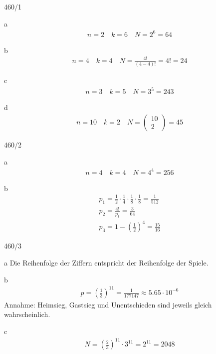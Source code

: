 \begin{exercise}{460/1}
  \item [a]
  \begin{gather*}
    n = 2 \quad k = 6 \quad N = 2^6 = 64
  \end{gather*}
  \item [b]
  \begin{gather*}
    n = 4 \quad k = 4 \quad N = \frac{4!}{(4 - 4)!} = 4! = 24
  \end{gather*}
  \item [c]
  \begin{gather*}
    n = 3 \quad k = 5 \quad N = 3^5 = 243
  \end{gather*}
  \item [d]
  \begin{gather*}
    n = 10 \quad k = 2 \quad N = \begin{pmatrix}10 \\ 2\end{pmatrix} = 45
  \end{gather*}
\end{exercise}
\begin{exercise}{460/2}
  \item [a]
  \begin{gather*}
    n = 4 \quad k = 4 \quad N = 4^4 = 256
  \end{gather*}
  \item [b]
  \begin{gather*}
    p_1 = \frac{1}{2} \cdot \frac{1}{4} \cdot \frac{1}{8} \cdot \frac{1}{8} = \frac{1}{512} \\
    p_2 = \frac{4!}{p_1} = \frac{3}{64} \\
    p_3 = 1 - (\frac{1}{2})^4 = \frac{15}{16}
  \end{gather*}
\end{exercise}
\begin{exercise}{460/3}
  \item [a] Die Reihenfolge der Ziffern entspricht der Reihenfolge der Spiele.
  \item [b]
  \begin{gather*}
    p = (\frac{1}{3})^{11} = \frac{1}{177147} \approx 5.65 \cdot 10^{-6}
  \end{gather*}
  Annahme: Heimsieg, Gastsieg und Unentschieden sind jeweils gleich wahrscheinlich.
  \item [c]
  \begin{gather*}
    N = (\frac{2}{3})^{11} \cdot 3^{11} = 2^{11} = 2048
  \end{gather*}
\end{exercise}

